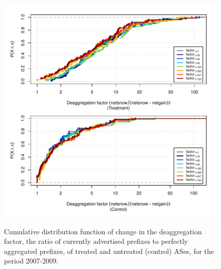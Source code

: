 \clearpage
\vspace*{1.25em}
\begin{figure}[H]
\begin{centering}
\begin{singlespace}
\captionsetup{list=no}
    \includegraphics[width=6in]
    {figures/behavior-deagg_factor-2007_2009-corr.pdf}
    \vspace{-2em}\\
    \caption{Cumulative distribution function of change in the deaggregation
    factor, the ratio of currently advertised prefixes to perfectly aggregated
    prefixes, of treated and untreated (control) ASes, for the period
    2007-2009.}
\end{singlespace}
\end{centering}
\end{figure}

